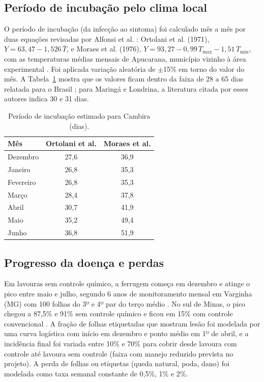\documentclass[11pt,a4paper]{article}
\begin{document}
\subsection{Período de incubação pelo clima local}
O período de incubação (da infecção ao sintoma) foi calculado mês a mês por duas equações revisadas por Alfonsi et al. \cite{alfonsi2019}: Ortolani et al. (1971), $Y = 63{,}47 - 1{,}526\,\bar{T}$, e Moraes et al. (1976), $Y = 93{,}27 - 0{,}99\,T_{\max} - 1{,}51\,T_{\min}$, com as temperaturas médias mensais de Apucarana, município vizinho à área experimental \cite{climatempo}. Foi aplicada variação aleatória de $\pm$15\% em torno do valor do mês. A Tabela~\ref{tab:ip} mostra que os valores ficam dentro da faixa de 28 a 65 dias relatada para o Brasil \cite{alfonsi2019}; para Maringá e Londrina, a literatura citada por esses autores indica 30 e 31 dias.

\begin{table}[H]\centering\small
\caption{Período de incubação estimado para Cambira (dias).}\label{tab:ip}
\begin{tabular}{lcc}\toprule
Mês & Ortolani et al. & Moraes et al. \\\midrule
Dezembro & 27,6 & 36,9 \\
Janeiro & 26,8 & 35,3 \\
Fevereiro & 26,8 & 35,3 \\
Março & 28,4 & 37,8 \\
Abril & 30,7 & 41,9 \\
Maio & 35,2 & 49,4 \\
Junho & 36,8 & 51,9 \\\bottomrule
\end{tabular}
\end{table}

\subsection{Progresso da doença e perdas}
Em lavouras sem controle químico, a ferrugem começa em dezembro e atinge o pico entre maio e julho, segundo 6 anos de monitoramento mensal em Varginha (MG) com 100 folhas do 3º e 4º par do terço médio \cite{japiassu2005,meira2009}. No sul de Minas, o pico chegou a 87,5\% e 91\% sem controle químico e ficou em 15\% com controle convencional \cite{lopes2012}. A fração de folhas etiquetadas que mostram lesão foi modelada por uma curva logística com início em dezembro e ponto médio em 1º de abril, e a incidência final foi variada entre 10\% e 70\% para cobrir desde lavoura com controle até lavoura sem controle (faixa com manejo reduzido prevista no projeto). A perda de folhas ou etiquetas (queda natural, poda, dano) foi modelada como taxa semanal constante de 0,5\%, 1\% e 2\%.
\end{document}
